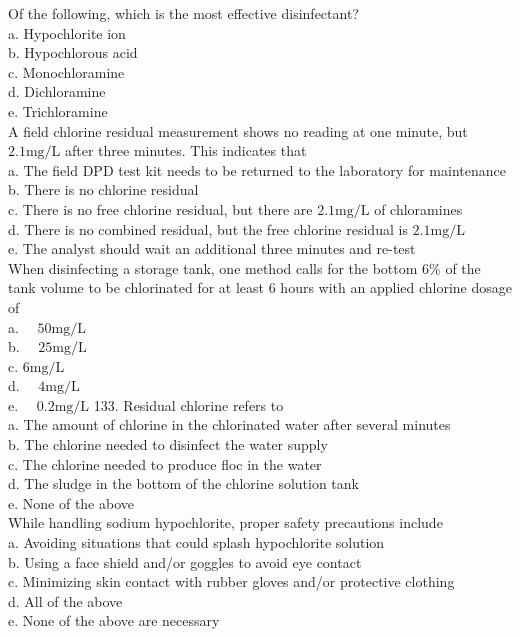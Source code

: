 Of the following, which is the most effective disinfectant?\\
a. Hypochlorite ion\\
b. Hypochlorous acid\\
c. Monochloramine\\
d. Dichloramine\\
e. Trichloramine\\

A field chlorine residual measurement shows no reading at one minute, but $2.1 \mathrm{mg} / \mathrm{L}$ after three minutes. This indicates that\\
a. The field DPD test kit needs to be returned to the laboratory for maintenance\\
b. There is no chlorine residual\\
c. There is no free chlorine residual, but there are $2.1 \mathrm{mg} / \mathrm{L}$ of chloramines\\
d. There is no combined residual, but the free chlorine residual is $2.1 \mathrm{mg} / \mathrm{L}$\\
e. The analyst should wait an additional three minutes and re-test\\

When disinfecting a storage tank, one method calls for the bottom $6 \%$ of the tank volume to be chlorinated for at least 6 hours with an applied chlorine dosage of\\
a. $\quad 50 \mathrm{mg} / \mathrm{L}$\\
b. $\quad 25 \mathrm{mg} / \mathrm{L}$\\
c. $6 \mathrm{mg} / \mathrm{L}$\\
d. $\quad 4 \mathrm{mg} / \mathrm{L}$\\
e. $\quad 0.2 \mathrm{mg} / \mathrm{L}$ 133. Residual chlorine refers to\\
a. The amount of chlorine in the chlorinated water after several minutes\\
b. The chlorine needed to disinfect the water supply\\
c. The chlorine needed to produce floc in the water\\
d. The sludge in the bottom of the chlorine solution tank\\
e. None of the above\\

While handling sodium hypochlorite, proper safety precautions include\\
a. Avoiding situations that could splash hypochlorite solution\\
b. Using a face shield and/or goggles to avoid eye contact\\
c. Minimizing skin contact with rubber gloves and/or protective clothing\\
d. All of the above\\
e. None of the above are necessary\\

